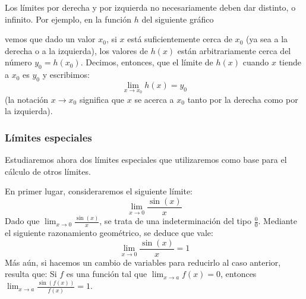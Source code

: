 \documentclass[../teoria.root.tex]{subfiles}
\begin{document}
Los límites por derecha y por izquierda no necesariamente deben dar distinto, o infinito.
Por ejemplo, en la función \(h\) del siguiente gráfico
\begin{center}
\end{center}
vemos que dado un valor \(x_0\), si \(x\) está suficientemente cerca de \(x_0\) (ya sea a la derecha o a la izquierda), los valores de \(h(x)\) están arbitrariamente cerca del número \(y_0=h(x_0)\).
Decimos, entonces, que el límite de \(h(x)\) cuando \(x\) tiende a \(x_0\) es \(y_0\) y escribimos:
\[\lim_{x\to x_0}h(x)=y_0\]
(la notación \(x\to x_0\) significa que \(x\) se acerca a \(x_0\) tanto por la derecha como por la izquierda).
\subsubsection{Límites especiales}
Estudiaremos ahora dos límites especiales que utilizaremos como base para el cálculo de otros límites.

En primer lugar, consideraremos el siguiente límite:
\[\lim_{x\to0}\frac{\sin(x)}{x}\]
Dado que \(\lim_{x\to0}\frac{\sin(x)}{x}\), se trata de una indeterminación del tipo \(\frac{0}{0}\).
Mediante el siguiente razonamiento geométrico, se deduce que vale:
\[\lim_{x\to0}\frac{\sin(x)}{x}=1\]
Más aún, si hacemos un cambio de variables para reducirlo al caso anterior, resulta que:
Si \(f\) es una función tal que \(\lim_{x\to a}f(x)=0\), entonces \(\lim_{x\to a}\frac{\sin(f(x))}{f(x)}=1\).
\end{document}
